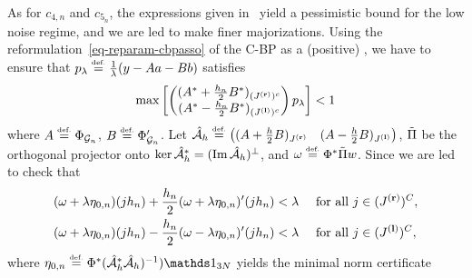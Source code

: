 As for $c_{4,n}$ and $c_{5_n}$, the expressions given in~\cite[Appendix C.2]{2016-duval-thinlasso} yield a pessimistic bound for the low noise regime, and we are led to make finer majorizations.
  Using the reformulation~\eqref{eq-reparam-cbpasso} of the C-BP as a (positive) \lasso, we have to ensure that $p_{\lambda}\stackrel{\mbox{\upshape\tiny def.}}{=} \frac{1}{\lambda}( y- {A}a -{B}b
  )$ satisfies   
\begin{align*}
    \max \left[  \begin{pmatrix}
({A}^*+\frac{{h_n}}{2} {B}^*)_{({J^{\mathbf{(r)}}})^c}\\ ({A}^*-\frac{{h_n}}{2} {B}^*)_{({J^{\mathbf{(l)}}})^c}
  \end{pmatrix}p_{\lambda}
\right]<1
\end{align*}
where ${A} \stackrel{\mbox{\upshape\tiny def.}}{=} \Phi_{\mathcal{G}_n}$, ${B}\stackrel{\mbox{\upshape\tiny def.}}{=}\Phi'_{\mathcal{G}_n}$. 
  Let ${\hat{\mathcal{A}}_h} \stackrel{\mbox{\upshape\tiny def.}}{=}\begin{pmatrix}({A}+\frac{h}{2}{B})_{{J^{\mathbf{(r)}}}} &({A}-\frac{h}{2}{B})_{{J^{\mathbf{(l)}}}}\end{pmatrix}$, $\tilde{\Pi}$ be the orthogonal projector onto $\ker {\hat{\mathcal{A}}_h}^*=(\operatorname{Im} {\hat{\mathcal{A}}_h})^\perp$, and $\omega\stackrel{\mbox{\upshape\tiny def.}}{=} \Phi^*\tilde{\Pi} w$. Since 
	we are led to check that
  \begin{align}
    (\omega +\lambda \eta_{0,n})(j{h_n}) + \frac{{h_n}}{2} (\omega +\lambda \eta_{0,n})'(j{h_n}) &<\lambda \quad \mbox{ for all } j\in ({J^{\mathbf{(r)}}})^C,\label{eq-tight-snr-cbpU}\\
    (\omega +\lambda \eta_{0,n})(j{h_n}) - \frac{{h_n}}{2} (\omega -\lambda \eta_{0,n})'(j{h_n}) &<\lambda \quad \mbox{ for all } j\in ({J^{\mathbf{(l)}}})^C\label{eq-tight-snr-cbpD},
  \end{align}
  where $\muon\eqdef \Phi^*(\Copt^*\Copt)^{-1})\bun_{3N}$ yields the minimal norm certificate 

